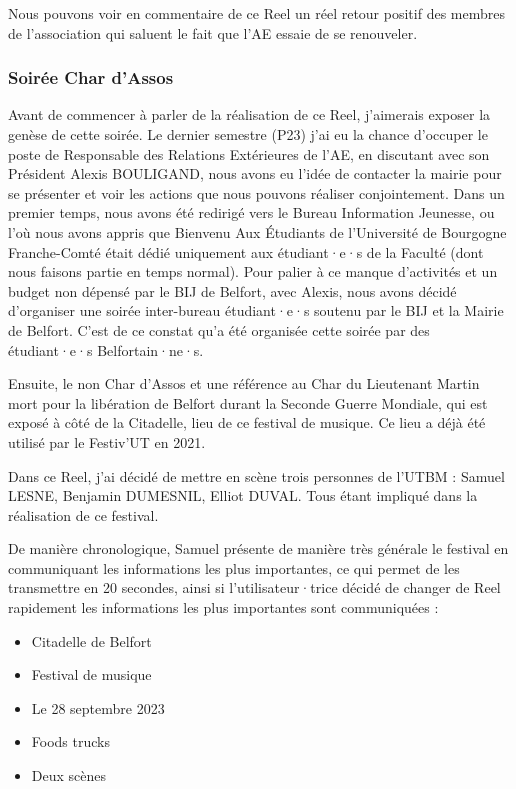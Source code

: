 Nous pouvons voir en commentaire de ce Reel un réel retour positif des membres de l'association qui saluent le fait que l'\gls{AE} essaie de se renouveler.

\subsubsection{Soirée Char d'Assos}

Avant de commencer à parler de la réalisation de ce Reel, j'aimerais exposer la genèse de cette soirée.
Le dernier semestre (P23) j'ai eu la chance d'occuper le poste de Responsable des Relations Extérieures de l'\gls{AE}, en discutant avec son Président Alexis BOULIGAND, nous avons eu l'idée de contacter la mairie pour se présenter et voir les actions que nous pouvons réaliser conjointement.
Dans un premier temps, nous avons été redirigé vers le Bureau Information Jeunesse, ou l'où nous avons appris que Bienvenu Aux Étudiants de l'Université de Bourgogne Franche-Comté était dédié uniquement aux étudiant·e·s de la Faculté (dont nous faisons partie en temps normal).
Pour palier à ce manque d'activités et un budget non dépensé par le BIJ de Belfort, avec Alexis, nous avons décidé d'organiser une soirée inter-bureau étudiant·e·s soutenu par le BIJ et la Mairie de Belfort.
C'est de ce constat qu'a été organisée cette soirée par des étudiant·e·s Belfortain·ne·s.

Ensuite, le non Char d'Assos et une référence au Char du Lieutenant Martin mort pour la libération de Belfort durant la Seconde Guerre Mondiale, qui est exposé à côté de la Citadelle, lieu de ce festival de musique.
Ce lieu a déjà été utilisé par le Festiv'UT en 2021.

Dans ce Reel, j'ai décidé de mettre en scène trois personnes de l'\gls{UTBM} : Samuel LESNE, Benjamin DUMESNIL, Elliot DUVAL.
Tous étant impliqué dans la réalisation de ce festival.

De manière chronologique, Samuel présente de manière très générale le festival en communiquant les informations les plus importantes, ce qui permet de les transmettre en 20 secondes, ainsi si l'utilisateur·trice décidé de changer de Reel rapidement les informations les plus importantes sont communiquées :
\begin{itemize}
    \item Citadelle de Belfort
    \item Festival de musique
    \item Le 28 septembre 2023
    \item Foods trucks
    \item Deux scènes
\end{itemize}

